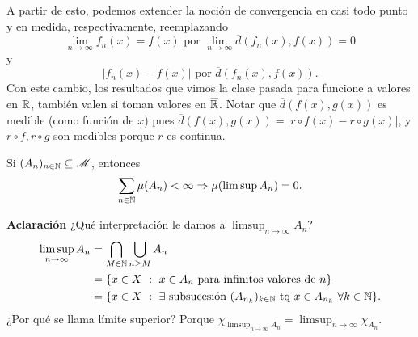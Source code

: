 
A partir de esto, podemos extender la noción de convergencia en casi todo punto y en medida, respectivamente, reemplazando 
\[ \lim_{n \to \infty} f_n(x) = f(x) \text{ por } \lim_{n \to \infty} \overline{d}(f_n(x), f(x)) = 0 \]
y
\[ |f_n(x) - f(x)| \text{ por } \overline{d}(f_n(x), f(x)). \]
Con este cambio, los resultados que vimos la clase pasada para funcione a valores en $\mathbb{R}$, también valen si toman valores en $\overline{\mathbb{R}}$. Notar que $\overline{d}(f(x), g(x))$ es medible (como función de $x$) pues $\overline{d}(f(x), g(x)) = |r \circ f(x) - r \circ g(x)|$, y $r \circ f, r \circ g$ son medibles porque $r$ es continua.

\begin{lemma}
	Si $(A_n)_{n\in\mathbb{N}} \subseteq \mathscr{M}$, entonces
	\[ \sum_{n\in\mathbb{N}} \mu(A_n) < \infty \Rightarrow \mu(\limsup A_n) = 0. \]
\end{lemma}

\noindent \textbf{Aclaración} ¿Qué interpretación le damos a $\limsup_{n \to \infty} A_n$?
\begin{align*}
	\limsup_{n \to \infty} A_n &= \bigcap_{M\in\mathbb{N}} \bigcup_{n \geq M} A_n \\
	&= \{x \in X \ : \ x \in A_n \text{ para infinitos valores de } n\}   \\
	&= \{x \in X \ : \ \exists \text{ subsucesión } (A_{n_k})_{k\in\mathbb{N}} \text{ tq } x \in A_{n_k} \ \forall k \in \mathbb{N}\}.
\end{align*}
¿Por qué se llama límite superior? Porque $\chi_{\limsup_{n \to \infty} A_n} = \limsup_{n \to \infty} \chi_{A_n}$.

